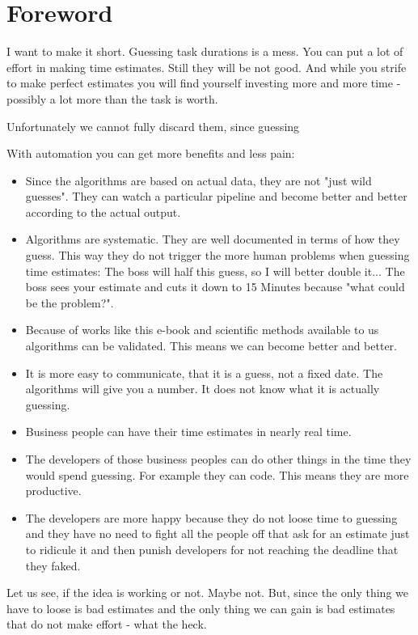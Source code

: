 \hypertarget{foreword}{%
\section{Foreword}\label{foreword}}

I want to make it short. Guessing task durations is a mess. You can put a lot of effort in making time estimates. Still they will be not good. And while you strife to make perfect estimates you will find yourself investing more and more time - possibly a lot more than the task is worth.

Unfortunately we cannot fully discard them, since guessing

With automation you can get more benefits and less pain:

\begin{itemize}
\tightlist
\item
  Since the algorithms are based on actual data, they are not "just wild guesses". They can watch a particular pipeline and become better and better according to the actual output.
\item
  Algorithms are systematic. They are well documented in terms of how they guess. This way they do not trigger the more human problems when guessing time estimates: The boss will half this guess, so I will better double it... The boss sees your estimate and cuts it down to 15 Minutes because "what could be the problem?".
\item
  Because of works like this e-book and scientific methods available to us algorithms can be validated. This means we can become better and better.
\item
  It is more easy to communicate, that it is a guess, not a fixed date. The algorithms will give you a number. It does not know what it is actually guessing. 
\item
  Business people can have their time estimates in nearly real time.
\item
  The developers of those business peoples can do other things in the time they would spend guessing. For example they can code. This means they are more productive.
\item
  The developers are more happy because they do not loose time to guessing and they have no need to fight all the people off that ask for an estimate just to ridicule it and then punish developers for not reaching the deadline that they faked. 
\end{itemize}

Let us see, if the idea is working or not. Maybe not. But, since the only thing we have to loose is bad estimates and the only thing we can gain is bad estimates that do not make effort - what the heck.
